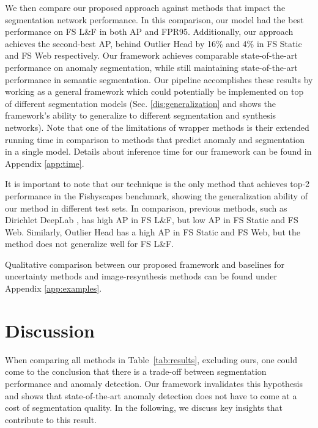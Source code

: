 \documentclass[final]{cvpr}
\begin{document}
We then compare our proposed approach against methods that impact the segmentation network performance. In this comparison, our model had the best performance on FS L\&F in both AP and FPR95. Additionally, our approach achieves the second-best AP, behind Outlier Head \cite{anomaly_score} by 16\% and 4\% in FS Static and FS Web respectively. 
Our framework achieves comparable state-of-the-art performance on anomaly segmentation, while still maintaining state-of-the-art performance in semantic segmentation.  
Our pipeline accomplishes these results by working as a general framework which could potentially be implemented on top of different segmentation models (Sec. \ref{dis:generalization} and shows the framework's ability to generalize to different segmentation and synthesis networks). 
Note that one of the limitations of wrapper methods is their extended running time in comparison to methods that predict anomaly and segmentation in a single model. Details about inference time for our framework can be found in Appendix \ref{app:time}.

It is important to note that our technique is the only method that achieves top-2 performance in the Fishyscapes benchmark, showing the generalization ability of our method in different test sets. 
In comparison, previous methods, such as Dirichlet DeepLab \cite{prior_entropy}, has high AP in FS L\&F, but low AP in FS Static and FS Web. 
Similarly, Outlier Head \cite{anomaly_score} has a high AP in FS Static and FS Web, but the method does not generalize well for FS L\&F.

Qualitative comparison between our proposed framework and baselines for uncertainty methods \cite{MSP} and image-resynthesis methods \cite{epfl} can be found under Appendix \ref{app:examples}.




 









%
 \section{Discussion}
\label{discussion}
When comparing all methods in Table~\ref{tab:results}, excluding ours, one could come to the conclusion that there is a trade-off between segmentation performance and anomaly detection. Our framework invalidates this hypothesis and shows that state-of-the-art anomaly detection does not have to come at a cost of segmentation quality. In the following, we discuss key insights that contribute to this result.
\end{document}
